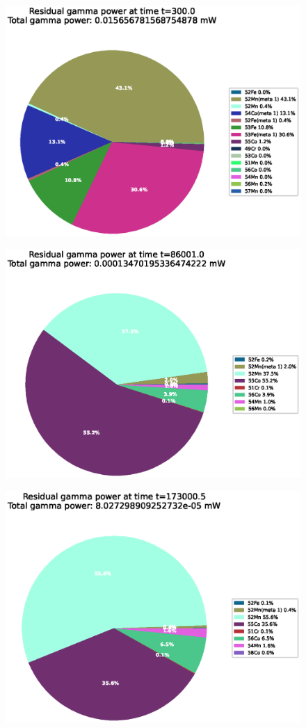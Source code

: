 \begin{figure}[!htb]
\centering
\includegraphics[width=0.8\linewidth]{chapters/results_activity_code/fe-activity-v2/residual-energy/0100_300.eps}
\caption{}
\label{fig:activity-v2-residual-power-300s}
\end{figure}

\begin{figure}[!htb]
\centering
\includegraphics[width=0.8\linewidth]{chapters/results_activity_code/fe-activity-v2/residual-energy/0166_86001.eps}
\caption{}
\label{fig:activity-v2-residual-power-86001s}
\end{figure}

\begin{figure}[!htb]
\centering
\includegraphics[width=0.8\linewidth]{chapters/results_activity_code/fe-activity-v2/residual-energy/0233_173000.eps}
\caption{}
\label{fig:activity-v2-residual-power-173000s}
\end{figure}

